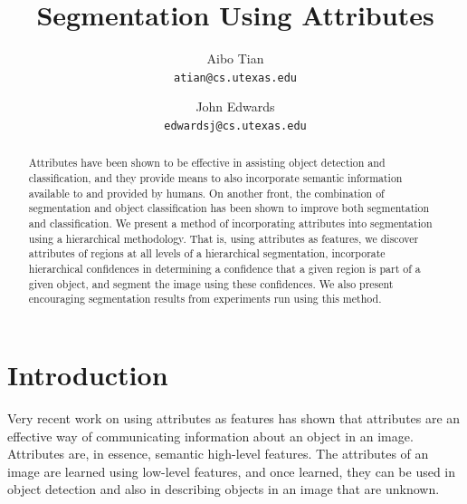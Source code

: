 \documentclass[10pt,twocolumn,letterpaper]{article}
\begin{document}
\title{Segmentation Using Attributes}

\author{Aibo Tian\\
{\tt\small atian@cs.utexas.edu}
\and
John Edwards\\
{\tt\small edwardsj@cs.utexas.edu}
}

\maketitle
\thispagestyle{empty}

\begin{abstract}
Attributes have been shown to be effective in assisting object detection and
classification, and they provide means to also incorporate semantic
information available to and provided by humans.  On another front, the
combination of segmentation and object classification has been shown to
improve both segmentation and classification.  We present a method of incorporating
attributes into segmentation using a hierarchical methodology.
That is, using attributes as features, we discover attributes of regions
at all levels of a hierarchical segmentation, 
incorporate hierarchical confidences in determining a confidence that
a given region is part of a given object, and segment the image using
these confidences.  We also present encouraging segmentation results 
from experiments run using this method.
\end{abstract}

\section{Introduction}
Very recent work on using attributes as features \cite{farhadi09, lampert09}
has shown that attributes are an effective way of communicating information
about an object in an image.  Attributes are, in essence, semantic high-level
features.  The attributes of an image are learned using low-level features,
and once learned, they can be used in object detection and also in describing
objects in an image that are unknown.
\end{document}
